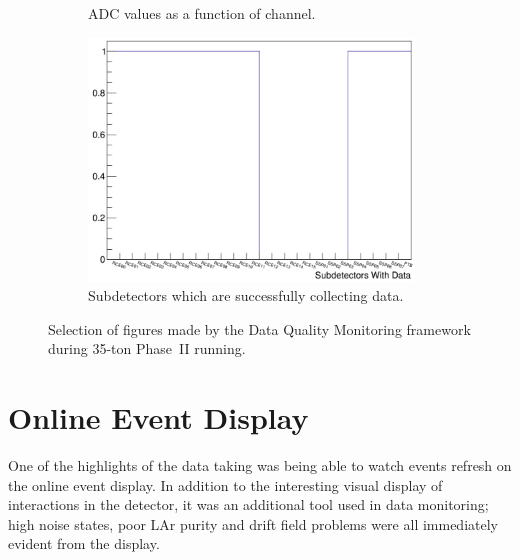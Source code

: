 \begin{figure}
\begin{subfigure}[t]{0.48\linewidth}
    \caption{ADC values as a function of channel.}
    \label{fig:DQMPlot3}
  \end{subfigure}
  \begin{subfigure}[t]{0.48\linewidth}
    \centering
    \includegraphics[width=0.95\textwidth]{DQM4.png}
    \caption{Subdetectors which are successfully collecting data.}
    \label{fig:DQMPlot4}
  \end{subfigure}
  \caption[Selection of figures made by the Data Quality Monitoring framework during 35-ton Phase~II running.]{Selection of figures made by the Data Quality Monitoring framework during 35-ton Phase~II running.}
  \label{fig:DQMPlots}
\end{figure}

\section{Online Event Display}\label{sec:EventDisplay}

One of the highlights of the data taking was being able to watch events refresh on the online event display.  In addition to the interesting visual display of interactions in the detector, it was an additional tool used in data monitoring; high noise states, poor LAr purity and drift field problems were all immediately evident from the display.


